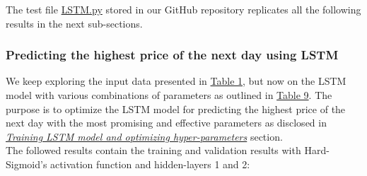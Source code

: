 The test file \href{https://github.com/fabiorodp/UiO-FYS-STK4155/tree/master/Project3/LSTM.py}{LSTM.py} stored in our GitHub repository replicates all the following results in the next sub-sections.

\subsubsection{Predicting the highest price of the next day using LSTM}
\label{chap:Predicting the highest price of the next day using LSTM}

\quad We keep exploring the input data presented in \hyperref[table:TrainingFeatures]{Table 1}, but now on the LSTM model with various combinations of parameters as outlined in \hyperref[table:Hyper-parameters for LSTM]{Table 9}. The purpose is to optimize the LSTM model for predicting the highest price of the next day with the most promising and effective parameters as disclosed in \hyperref[chap:Training LSTM model and optimizing hyper-parameters]{\textit{Training LSTM model and optimizing hyper-parameters}} section.\\

The followed results contain the training and validation results with Hard-Sigmoid's activation function and hidden-layers 1 and 2:

